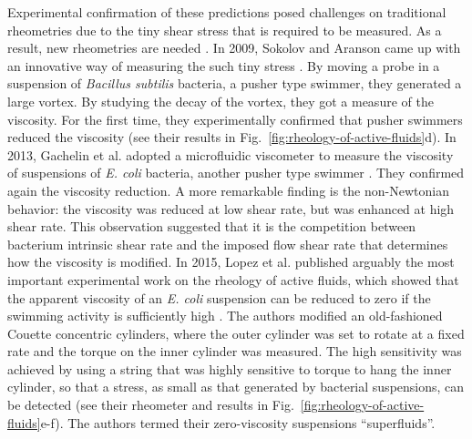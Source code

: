 Experimental confirmation of these predictions posed challenges on traditional rheometries due to the tiny shear stress that is required to be measured. As a result, new rheometries are needed \cite{Marchetti2015}. In 2009, Sokolov and Aranson came up with an innovative way of measuring the such tiny stress \cite{Sokolov2009}. By moving a probe in a suspension of \textit{Bacillus subtilis} bacteria, a pusher type swimmer, they generated a large vortex. By studying the decay of the vortex, they got a measure of the viscosity. For the first time, they experimentally confirmed that pusher swimmers reduced the viscosity (see their results in Fig.~\ref{fig:rheology-of-active-fluids}d). In 2013, Gachelin et al. adopted a microfluidic viscometer to measure the viscosity of suspensions of \textit{E. coli} bacteria, another pusher type swimmer \cite{Gachelin2013}. They confirmed again the viscosity reduction. A more remarkable finding is the non-Newtonian behavior: the viscosity was reduced at low shear rate, but was enhanced at high shear rate. This observation suggested that it is the competition between bacterium intrinsic shear rate and the imposed flow shear rate that determines how the viscosity is modified. In 2015, Lopez et al. published arguably the most important experimental work on the rheology of active fluids, which showed that the apparent viscosity of an \textit{E. coli} suspension can be reduced to zero if the swimming activity is sufficiently high \cite{Lopez2015}. The authors modified an old-fashioned Couette concentric cylinders, where the outer cylinder was set to rotate at a fixed rate and the torque on the inner cylinder was measured. The high sensitivity was achieved by using a string that was highly sensitive to torque to hang the inner cylinder, so that a stress, as small as that generated by bacterial suspensions, can be detected (see their rheometer and results in Fig.~\ref{fig:rheology-of-active-fluids}e-f). The authors termed their zero-viscosity suspensions ``superfluids''.

